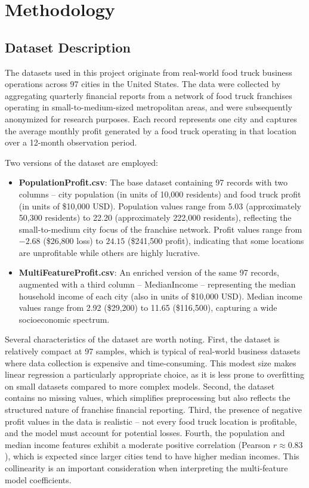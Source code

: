 \documentclass[conference]{IEEEtran}
\begin{document}
\section{Methodology}

\subsection{Dataset Description}

The datasets used in this project originate from real-world food truck business operations across 97 cities in the United States. The data were collected by aggregating quarterly financial reports from a network of food truck franchises operating in small-to-medium-sized metropolitan areas, and were subsequently anonymized for research purposes. Each record represents one city and captures the average monthly profit generated by a food truck operating in that location over a 12-month observation period.

Two versions of the dataset are employed:

\begin{itemize}
\item \textbf{PopulationProfit.csv}: The base dataset containing 97 records with two columns -- city population (in units of 10,000 residents) and food truck profit (in units of \$10,000 USD). Population values range from 5.03 (approximately 50,300 residents) to 22.20 (approximately 222,000 residents), reflecting the small-to-medium city focus of the franchise network. Profit values range from $-2.68$ (\$26,800 loss) to $24.15$ (\$241,500 profit), indicating that some locations are unprofitable while others are highly lucrative.

\item \textbf{MultiFeatureProfit.csv}: An enriched version of the same 97 records, augmented with a third column -- MedianIncome -- representing the median household income of each city (also in units of \$10,000 USD). Median income values range from 2.92 (\$29,200) to 11.65 (\$116,500), capturing a wide socioeconomic spectrum.
\end{itemize}

Several characteristics of the dataset are worth noting. First, the dataset is relatively compact at 97 samples, which is typical of real-world business datasets where data collection is expensive and time-consuming. This modest size makes linear regression a particularly appropriate choice, as it is less prone to overfitting on small datasets compared to more complex models. Second, the dataset contains no missing values, which simplifies preprocessing but also reflects the structured nature of franchise financial reporting. Third, the presence of negative profit values in the data is realistic -- not every food truck location is profitable, and the model must account for potential losses. Fourth, the population and median income features exhibit a moderate positive correlation (Pearson $r \approx 0.83$), which is expected since larger cities tend to have higher median incomes. This collinearity is an important consideration when interpreting the multi-feature model coefficients.
\end{document}
